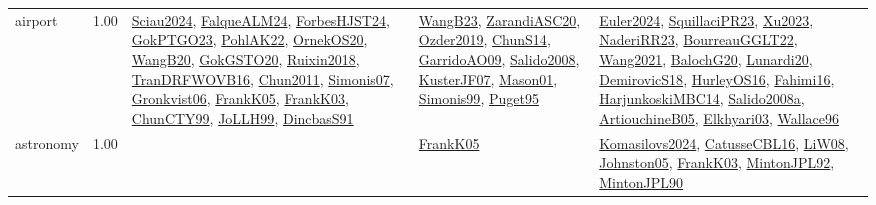 {\begin{longtable}{p{3cm}r>{\raggedright\arraybackslash}p{6cm}>{\raggedright\arraybackslash}p{6cm}>{\raggedright\arraybackslash}p{8cm}}
\index{airport}\index{ApplicationAreas!airport}airport &  1.00 & \hyperref[detail:Sciau2024]{Sciau2024}, \hyperref[detail:FalqueALM24]{FalqueALM24}, \hyperref[detail:ForbesHJST24]{ForbesHJST24}, \hyperref[detail:GokPTGO23]{GokPTGO23}, \hyperref[detail:PohlAK22]{PohlAK22}, \hyperref[detail:OrnekOS20]{OrnekOS20}, \hyperref[detail:WangB20]{WangB20}, \hyperref[detail:GokGSTO20]{GokGSTO20}, \hyperref[detail:Ruixin2018]{Ruixin2018}, \hyperref[detail:TranDRFWOVB16]{TranDRFWOVB16}, \hyperref[detail:Chun2011]{Chun2011}, \hyperref[detail:Simonis07]{Simonis07}, \hyperref[detail:Gronkvist06]{Gronkvist06}, \hyperref[detail:FrankK05]{FrankK05}, \hyperref[detail:FrankK03]{FrankK03}, \hyperref[detail:ChunCTY99]{ChunCTY99}, \hyperref[detail:JoLLH99]{JoLLH99}, \hyperref[detail:DincbasS91]{DincbasS91} & \hyperref[detail:WangB23]{WangB23}, \hyperref[detail:ZarandiASC20]{ZarandiASC20}, \hyperref[detail:Ozder2019]{Ozder2019}, \hyperref[detail:ChunS14]{ChunS14}, \hyperref[detail:GarridoAO09]{GarridoAO09}, \hyperref[detail:Salido2008]{Salido2008}, \hyperref[detail:KusterJF07]{KusterJF07}, \hyperref[detail:Mason01]{Mason01}, \hyperref[detail:Simonis99]{Simonis99}, \hyperref[detail:Puget95]{Puget95} & \hyperref[detail:Euler2024]{Euler2024}, \hyperref[detail:SquillaciPR23]{SquillaciPR23}, \hyperref[detail:Xu2023]{Xu2023}, \hyperref[detail:NaderiRR23]{NaderiRR23}, \hyperref[detail:BourreauGGLT22]{BourreauGGLT22}, \hyperref[detail:Wang2021]{Wang2021}, \hyperref[detail:BalochG20]{BalochG20}, \hyperref[detail:Lunardi20]{Lunardi20}, \hyperref[detail:DemirovicS18]{DemirovicS18}, \hyperref[detail:HurleyOS16]{HurleyOS16}, \hyperref[detail:Fahimi16]{Fahimi16}, \hyperref[detail:HarjunkoskiMBC14]{HarjunkoskiMBC14}, \hyperref[detail:Salido2008a]{Salido2008a}, \hyperref[detail:ArtiouchineB05]{ArtiouchineB05}, \hyperref[detail:Elkhyari03]{Elkhyari03}, \hyperref[detail:Wallace96]{Wallace96}\\
\index{astronomy}\index{ApplicationAreas!astronomy}astronomy &  1.00 &  & \hyperref[detail:FrankK05]{FrankK05} & \hyperref[detail:Komasilovs2024]{Komasilovs2024}, \hyperref[detail:CatusseCBL16]{CatusseCBL16}, \hyperref[detail:LiW08]{LiW08}, \hyperref[detail:Johnston05]{Johnston05}, \hyperref[detail:FrankK03]{FrankK03}, \hyperref[detail:MintonJPL92]{MintonJPL92}, \hyperref[detail:MintonJPL90]{MintonJPL90}\\

\end{longtable}}
